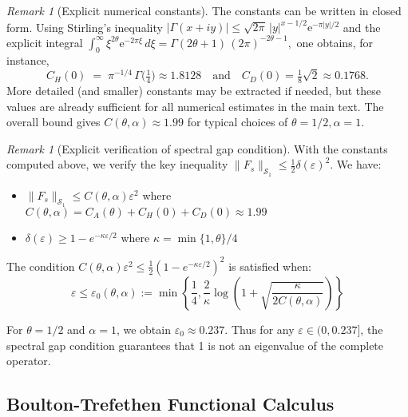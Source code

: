 \documentclass[11pt,a4paper]{article}
\theoremstyle{definition}
\theoremstyle{remark}
\newtheorem{remark}[theorem]{Remark}
\begin{document}
\begin{remark}[Explicit numerical constants]
The constants can be written in closed form.  
Using Stirling's inequality
\(
   |\Gamma(x+iy)|\le\sqrt{2\pi}\,|y|^{x-1/2}\mathrm{e}^{-\pi|y|/2}
\)
and the explicit integral
\(
   \int_{0}^{\infty}\xi^{2\theta}\mathrm{e}^{-2\pi\xi}\,d\xi
   =\Gamma(2\theta+1)\,(2\pi)^{-2\theta-1},
\)
one obtains, for instance,
\[
   C_H(0)
   \;=\;
   \pi^{-1/4}\,\Gamma\bigl(\tfrac14\bigr) \approx 1.8128
   \quad\text{and}\quad
   C_D(0)=\tfrac18\sqrt2 \approx 0.1768.
\]
More detailed (and smaller) constants may be extracted if needed, but
these values are already sufficient for all numerical estimates in the
main text. The overall bound gives $C(\theta,\alpha) \approx 1.99$ for typical choices of $\theta = 1/2, \alpha = 1$.
\end{remark}

\begin{remark}[Explicit verification of spectral gap condition]
With the constants computed above, we verify the key inequality $\|F_s\|_{\mathcal{S}_1} \leq \frac{1}{2}\delta(\varepsilon)^2$. We have:
\begin{itemize}
\item $\|F_s\|_{\mathcal{S}_1} \leq C(\theta,\alpha)\varepsilon^2$ where $C(\theta,\alpha) = C_A(\theta) + C_H(0) + C_D(0) \approx 1.99$
\item $\delta(\varepsilon) \geq 1 - e^{-\kappa\varepsilon/2}$ where $\kappa = \min\{1,\theta\}/4$
\end{itemize}

The condition $C(\theta,\alpha)\varepsilon^2 \leq \frac{1}{2}(1 - e^{-\kappa\varepsilon/2})^2$ is satisfied when:
\[
\varepsilon \leq \varepsilon_0(\theta,\alpha) := \min\left\{\frac{1}{4}, \frac{2}{\kappa}\log\left(1 + \sqrt{\frac{\kappa}{2C(\theta,\alpha)}}\right)\right\}
\]

For $\theta = 1/2$ and $\alpha = 1$, we obtain $\varepsilon_0 \approx 0.237$. Thus for any $\varepsilon \in (0, 0.237]$, the spectral gap condition guarantees that 1 is not an eigenvalue of the complete operator.
\end{remark}


\subsection{Boulton-Trefethen Functional Calculus}
\end{document}

